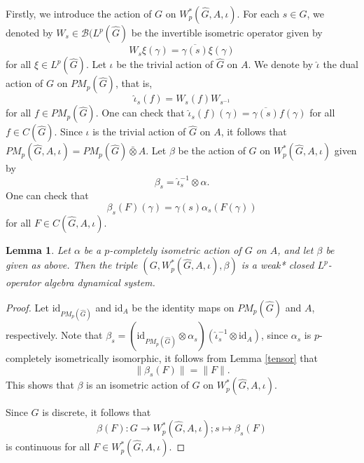 \documentclass[reqno,11pt]{amsart}
\theoremstyle{plain}
\newtheorem{lem}[thm]{Lemma}
\theoremstyle{definition}
\theoremstyle{remark}
\begin{document}
Firstly, we introduce the action of $G$ on $W^*_p(\hat{G},A,\iota)$.
For each $s\in G$, we denoted by $W_s\in \mathcal{B}(L^p(\hat{G})$ be the invertible isometric operator given by $$W_s\xi(\gamma)=\overline{\gamma(s)}\xi(\gamma)$$ for all $\xi\in L^p(\hat{G})$.
Let $\iota$ be the trivial action of $\hat{G}$ on $A$. We denote by $\hat{\iota}$ the dual action of $G$ on $PM_p(\hat{G})$, that is, $$\hat{\iota}_s(f)=W_s(f)W_{s^{-1}}$$ for all $f\in PM_p(\hat{G})$.
One can check that $\hat{\iota}_s(f)(\gamma)=\overline{\gamma(s)}f(\gamma)$ for all $f\in C(\hat{G})$.
Since $\iota$ is the trivial action of $\hat{G}$ on $A$, it follows that $PM_p(\hat{G},A,\iota)=PM_p(\hat{G})\bar{\otimes}A$.
Let $\beta$ be the action of $G$ on $W^*_p(\hat{G},A,\iota)$ given by $$\beta_s=\hat{\iota}_s^{-1}\otimes\alpha.$$
One can check that $$\beta_s(F)(\gamma)=\gamma(s)\alpha_s(F(\gamma))$$ for all $F\in C(\hat{G},A,\iota)$.


\begin{lem}
Let $\alpha$ be a $p$-completely isometric action of $G$ on $A$, and let $\beta$ be given as above. Then the triple $(G,W^*_p(\hat{G},A,\iota),\beta)$ is a weak* closed $L^p$-operator algebra dynamical system.
\end{lem}
\begin{proof}
Let $\mathrm{id}_{PM_p(\hat{G})}$ and $\mathrm{id}_A$ be the identity maps on $PM_p(\hat{G})$ and $A$, respectively.
Note that $\beta_s=(\mathrm{id}_{PM_p(\hat{G})}\otimes \alpha_s)(\hat{\iota}_s^{-1}\otimes\mathrm{id}_A)$, since $\alpha_s$ is $p$-completely isometrically isomorphic, it follows from Lemma \ref{tensor} that $$\|\beta_s(F)\|=\|F\|.$$
This shows that $\beta$ is an isometric action of $G$ on $W^*_p(\hat{G},A,\iota)$.

Since $G$ is discrete, it follows that $$\beta(F):G\rightarrow W^*_p(\hat{G},A,\iota); s\mapsto \beta_s(F)$$ is continuous for all $F\in W^*_p(\hat{G},A,\iota)$.
\end{proof}
\end{document}
